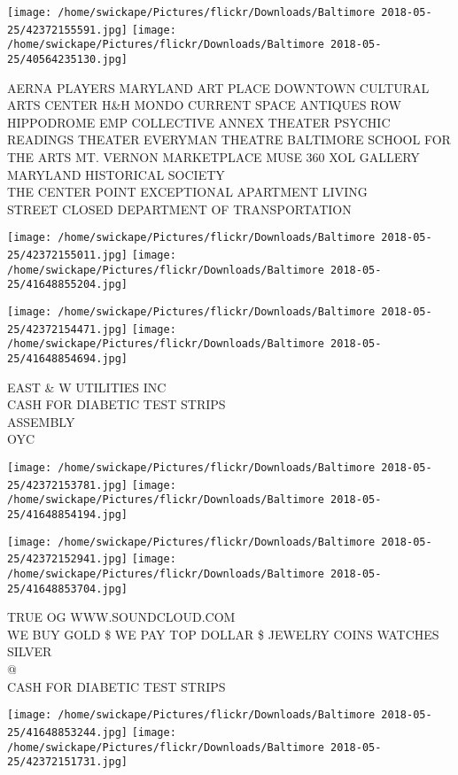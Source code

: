 \documentclass[10pt,letterpaper]{article}
\begin{document}
\texttt{[image: /home/swickape/Pictures/flickr/Downloads/Baltimore 2018-05-25/42372155591.jpg]}
\texttt{[image: /home/swickape/Pictures/flickr/Downloads/Baltimore 2018-05-25/40564235130.jpg]}

AERNA PLAYERS MARYLAND ART PLACE DOWNTOWN CULTURAL ARTS CENTER H\&H MONDO CURRENT SPACE ANTIQUES ROW\\
HIPPODROME EMP COLLECTIVE ANNEX THEATER PSYCHIC READINGS THEATER EVERYMAN THEATRE BALTIMORE SCHOOL FOR THE ARTS MT. VERNON MARKETPLACE MUSE 360 XOL GALLERY MARYLAND HISTORICAL SOCIETY\\
THE CENTER POINT EXCEPTIONAL APARTMENT LIVING\\
STREET CLOSED DEPARTMENT OF TRANSPORTATION
\pagebreak

\texttt{[image: /home/swickape/Pictures/flickr/Downloads/Baltimore 2018-05-25/42372155011.jpg]}
\texttt{[image: /home/swickape/Pictures/flickr/Downloads/Baltimore 2018-05-25/41648855204.jpg]}

\texttt{[image: /home/swickape/Pictures/flickr/Downloads/Baltimore 2018-05-25/42372154471.jpg]}
\texttt{[image: /home/swickape/Pictures/flickr/Downloads/Baltimore 2018-05-25/41648854694.jpg]}

EAST  \& W UTILITIES INC\\
CASH FOR DIABETIC TEST STRIPS\\
ASSEMBLY\\
OYC
\pagebreak

\texttt{[image: /home/swickape/Pictures/flickr/Downloads/Baltimore 2018-05-25/42372153781.jpg]}
\texttt{[image: /home/swickape/Pictures/flickr/Downloads/Baltimore 2018-05-25/41648854194.jpg]}

\texttt{[image: /home/swickape/Pictures/flickr/Downloads/Baltimore 2018-05-25/42372152941.jpg]}
\texttt{[image: /home/swickape/Pictures/flickr/Downloads/Baltimore 2018-05-25/41648853704.jpg]}

TRUE OG WWW.SOUNDCLOUD.COM\\
WE BUY GOLD \$ WE PAY TOP DOLLAR \$ JEWELRY COINS WATCHES SILVER\\
@\\
CASH FOR DIABETIC TEST STRIPS
\pagebreak

\texttt{[image: /home/swickape/Pictures/flickr/Downloads/Baltimore 2018-05-25/41648853244.jpg]}
\texttt{[image: /home/swickape/Pictures/flickr/Downloads/Baltimore 2018-05-25/42372151731.jpg]}
\end{document}
